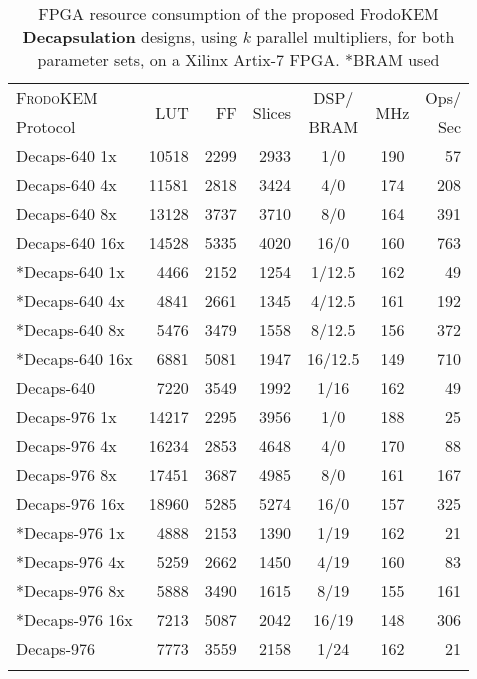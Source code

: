 \begin{table}[!t]
\centering
\caption{FPGA resource consumption of the proposed FrodoKEM \textbf{Decapsulation} designs, using $k$ parallel multipliers, for both parameter sets, on a Xilinx Artix-7 FPGA. *BRAM used}\label{tab:decapsresults}
\begin{tabular}{l r r r c c r}
\hline \Tstrut
  \textsc{FrodoKEM} & \multirow{2}{*}{LUT} & \multirow{2}{*}{FF} & \multirow{2}{*}{Slices} & DSP/ & \multirow{2}{*}{MHz} & Ops/ \\
Protocol &&&& BRAM && Sec  \\ \hline \Tstrut

Decaps-640 1x & 10518 & 2299 & 2933 & 1/0 & 190 & 57 \\
Decaps-640 4x & 11581 & 2818 & 3424 & 4/0 & 174 & 208 \\
Decaps-640 8x & 13128 & 3737 & 3710 & 8/0 & 164 & 391 \\
Decaps-640 16x & 14528 & 5335 & 4020 & 16/0 & 160 & 763 \\ \hline \Tstrut
*Decaps-640 1x & 4466 & 2152 & 1254 & 1/12.5 & 162 & 49 \\
*Decaps-640 4x & 4841 & 2661 & 1345 & 4/12.5 & 161 & 192 \\
*Decaps-640 8x & 5476 & 3479 & 1558 & 8/12.5 & 156 & 372 \\
*Decaps-640 16x & 6881 & 5081 & 1947 & 16/12.5 & 149 & 710 \\ \hline \Tstrut

Decaps-640 \cite{howe2018standard} & 7220 & 3549 & 1992 & 1/16 & 162 & 49 \\ \hline \Tstrut

Decaps-976 1x & 14217 & 2295 & 3956 & 1/0 & 188 & 25 \\
Decaps-976 4x & 16234 & 2853 & 4648 & 4/0 & 170 & 88 \\
Decaps-976 8x & 17451 & 3687 & 4985 & 8/0 & 161 & 167 \\
Decaps-976 16x & 18960 & 5285 & 5274 & 16/0 & 157 & 325 \\ \hline \Tstrut
*Decaps-976 1x & 4888 & 2153 & 1390 & 1/19 & 162 & 21 \\
*Decaps-976 4x & 5259 & 2662 & 1450 & 4/19 & 160 & 83 \\
*Decaps-976 8x & 5888 & 3490 & 1615 & 8/19 & 155 & 161 \\
*Decaps-976 16x & 7213 & 5087 & 2042 & 16/19 & 148 & 306 \\ \hline \Tstrut

Decaps-976 \cite{howe2018standard} & 7773 & 3559 & 2158 & 1/24 & 162 & 21 \\ \hline \Tstrut

\end{tabular}%
\end{table}

